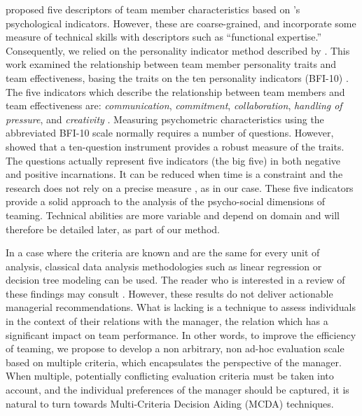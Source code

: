 \cite{ChenLin04} proposed five descriptors of team member characteristics based on \cite{Myersetal85}'s psychological indicators. However, these are coarse-grained, and incorporate some measure of technical skills with descriptors such as ``functional expertise.'' Consequently, we relied on the personality indicator method described by \cite{Driskelletal06}. This work examined the relationship between team member personality traits and team effectiveness, basing the traits on the ten personality indicators (BFI-10) \citep{McCraeCosta89}. The five indicators which describe the relationship between team members and team effectiveness are: {\it communication}, {\it commitment}, {\it collaboration}, {\it handling of pressure}, and {\it creativity} \citep{Driskelletal06}. Measuring psychometric characteristics using the abbreviated BFI-10 scale normally requires a number of questions. However, \cite{rammstedt:2007:measuring} showed that a ten-question instrument provides a robust measure of the traits. The questions actually represent five indicators (the big five) in both negative and positive incarnations. It can be reduced when time is a constraint and the research does not rely on a precise measure \citep{GoslingRentfrowSwann03}, as in our case. These five indicators provide a solid approach to the analysis of the psycho-social dimensions of teaming. Technical abilities are more variable and depend on domain and will therefore be detailed later, as part of our method.

In a case where the criteria are known and are the same for every unit of analysis, classical data analysis methodologies such as linear regression or decision tree modeling can be used. The reader who is interested in a review of these findings may consult \cite{Stewart06,Driskelletal06}. However, these results do not deliver actionable managerial recommendations. What is lacking is a technique to assess individuals in the context of their relations with the manager, the relation which has a significant impact on team performance. In other words, to improve the efficiency of teaming, we propose to develop a non arbitrary, non ad-hoc evaluation scale based on multiple criteria, which encapsulates the perspective of the manager. When multiple, potentially conflicting evaluation criteria must be taken into account, and the individual preferences of the manager should be captured, it is natural to turn towards Multi-Criteria Decision Aiding (MCDA) techniques.

